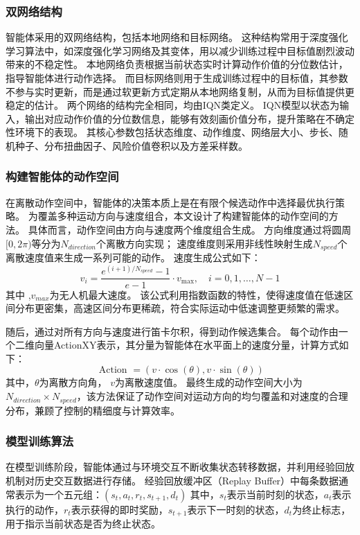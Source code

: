 \subsubsection{双网络结构}
智能体采用的双网络结构，包括本地网络和目标网络。
这种结构常用于深度强化学习算法中，如深度强化学习网络及其变体，用以减少训练过程中目标值剧烈波动带来的不稳定性。
本地网络负责根据当前状态实时计算动作价值的分位数估计，指导智能体进行动作选择。
而目标网络则用于生成训练过程中的目标值，其参数不参与实时更新，而是通过软更新方式定期从本地网络复制，从而为目标值提供更稳定的估计。
两个网络的结构完全相同，均由IQN类定义。
IQN模型以状态为输入，输出对应动作价值的分位数信息，能够有效刻画价值分布，提升策略在不确定性环境下的表现。
其核心参数包括状态维度、动作维度、网络层大小、步长、随机种子、分布扭曲因子、风险价值卷积以及方差采样数。
\subsubsection{构建智能体的动作空间}
在离散动作空间中，智能体的决策本质上是在有限个候选动作中选择最优执行策略。
为覆盖多种运动方向与速度组合，本文设计了构建智能体的动作空间的方法。
具体而言，动作空间由方向与速度两个维度组合生成。
方向维度通过将圆周$[0,2 \pi)$等分为$N_{direction}$个离散方向实现；
速度维度则采用非线性映射生成$N_{speed}$个离散速度值来生成一系列可能的动作。
速度生成公式如下：
\begin{equation}
v_{i}=\frac{e^{(i+1) / N_{speed}}-1}{e-1} \cdot v_{\max }, \quad i=0,1, \ldots, N-1
\end{equation}
其中 ,$v_{max }$为无人机最大速度。
该公式利用指数函数的特性，使得速度值在低速区间分布更密集，高速区间分布更稀疏，符合实际运动中低速调整更频繁的需求。

随后，通过对所有方向与速度进行笛卡尔积，得到动作候选集合。
每个动作由一个二维向量ActionXY表示，其分量为智能体在水平面上的速度分量，计算方式如下：
\begin{equation}
\text { Action }=(v \cdot \cos (\theta), v \cdot \sin (\theta))
\end{equation}
其中，$\theta$为离散方向角， $v$为离散速度值。
最终生成的动作空间大小为 $N_{direction}  \times  N_{speed}$，该方法保证了动作空间对运动方向的均匀覆盖和对速度的合理分布，兼顾了控制的精细度与计算效率。
\subsubsection{模型训练算法}
在模型训练阶段，智能体通过与环境交互不断收集状态转移数据，并利用经验回放机制对历史交互数据进行存储。
经验回放缓冲区（Replay Buffer）中每条数据通常表示为一个五元组：$\left(s_{t}, a_{t}, r_{t}, s_{t+1}, d_{t}\right)$
其中，$s_{t}$表示当前时刻的状态，$a_{t}$表示执行的动作，$r_{t}$表示获得的即时奖励，$s_{t+1}$表示下一时刻的状态，$d_{t}$为终止标志，用于指示当前状态是否为终止状态。

